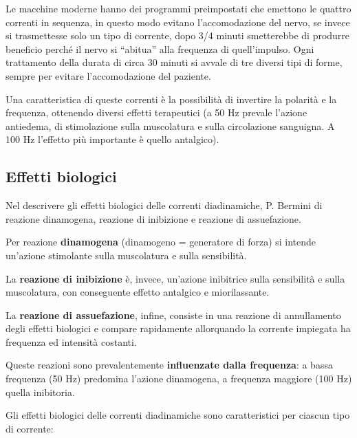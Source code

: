 Le macchine moderne hanno dei programmi preimpostati che emettono le quattro correnti in sequenza, in questo modo evitano l'accomodazione del nervo, se invece si trasmettesse solo un tipo di corrente, dopo 3/4
minuti smetterebbe di produrre beneficio perché il nervo si ``abitua'' alla frequenza di quell'impulso. Ogni trattamento della durata di circa 30 minuti si avvale di tre diversi tipi di forme, sempre per evitare l'accomodazione del paziente.

Una caratteristica di queste correnti è la possibilità di invertire la polarità e la frequenza, ottenendo diversi effetti terapeutici (a 50 Hz prevale l'azione antiedema, di stimolazione sulla muscolatura e sulla circolazione sanguigna. A 100 Hz l'effetto più importante è quello
antalgico).

\subsection{Effetti biologici}

Nel descrivere gli effetti biologici delle correnti diadinamiche, P. Bermini di reazione dinamogena, reazione di inibizione e reazione di assuefazione.

Per reazione \textbf{dinamogena} (dinamogeno = generatore di forza) si intende un'azione stimolante sulla muscolatura e sulla sensibilità.

La \textbf{reazione di inibizione} è, invece, un'azione inibitrice sulla sensibilità e sulla muscolatura, con conseguente effetto antalgico e miorilassante.

La \textbf{reazione di assuefazione}, infine, consiste in una reazione di annullamento degli effetti biologici e compare rapidamente allorquando la corrente impiegata ha frequenza ed intensità costanti.

Queste reazioni sono prevalentemente \textbf{influenzate dalla frequenza}: a bassa frequenza (50 Hz) predomina l'azione dinamogena, a frequenza maggiore (100 Hz) quella inibitoria.

Gli effetti biologici delle correnti diadinamiche sono caratteristici per ciascun tipo di corrente:

